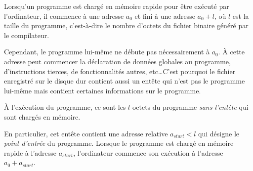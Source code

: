 \documentclass[../../../main.tex]{subfiles}
\begin{document}
Lorsqu'un programme est chargé en mémoire rapide pour être exécuté par l'ordinateur, il commence à une adresse $a_{0}$ et fini à une adresse $a_{0} + l$, où $l$ est la taille du programme, c'est-à-dire le nombre d'octets du fichier binaire généré par le compilateur.

Cependant, le programme lui-même ne débute pas nécessairement à $a_{0}$. À cette adresse peut commencer la déclaration de données globales au programme, d'instructions tierces, de fonctionnalités autres, etc\dots C'est pourquoi le fichier enregistré sur le disque dur contient aussi un entête qui n'est pas le programme lui-même mais contient certaines informations sur le programme.

À l'exécution du programme, ce sont les $l$ octets du programme \textit{sans l'entête} qui sont chargés en mémoire.

\begin{minipage}{\textwidth}
	\begin{center}
		
		\label{img:prgm}
	\end{center}
\end{minipage}

En particulier, cet entête contient une adresse relative $a_{start} < l$ qui désigne le \textit{point d'entrée} du programme. Lorsque le programme est chargé en mémoire rapide à l'adresse $a_{start}$, l'ordinateur commence son exécution à l'adresse $a_{0} + a_{start}$.
 
\end{document}
